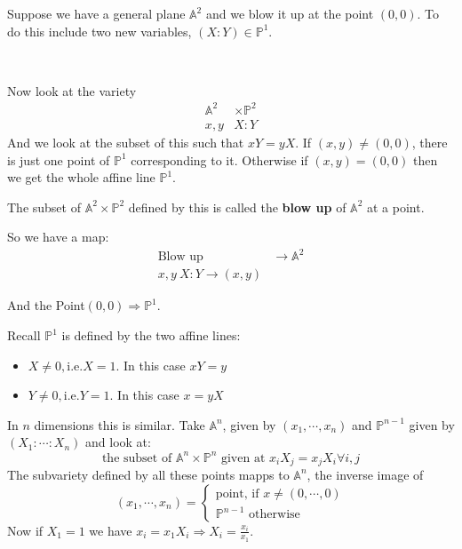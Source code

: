 Suppose we have a general plane $\mathbb{A}^2$ and we blow it up at the point $(0,0)$. To do this include two new variables, $(X\colon Y)\in \mathbb{P}^1$.

\

Now look at the variety \begin{align*}
    \mathbb{A}^2&\times \mathbb{P}^2\\
    x,y&X\colon Y
\end{align*}
And we look at the subset of this such that $xY = yX$. If $(x,y)\neq (0,0)$, there is just one point of $\mathbb{P}^1$ corresponding to it. Otherwise if $(x,y) = (0,0)$ then we get the whole affine line $\mathbb{P}^1$.
\begin{definition}
    The subset of $\mathbb{A}^2\times \mathbb{P}^2$ defined by this is called the \textbf{blow up} of $\mathbb{A}^2$ at a point.
    
    So we have a map:\begin{align*}
        \text{Blow up} &\rightarrow \mathbb{A}^2\\
        x,y \ X\colon Y\rightarrow (x,y)
    \end{align*}

    And the Point$(0,0)\Rightarrow \mathbb{P}^1$.
\end{definition}
Recall $\mathbb{P}^1$ is defined by the two affine lines:\begin{itemize}
    \item $X\neq 0, \text{i.e.} X=1$. In this case $xY=y$
    \item $Y\neq 0, \text{i.e.} Y=1$. In this case $x=yX$ 
\end{itemize}

\begin{definition}
    In $n$ dimensions this is similar. Take $\mathbb{A}^n$, given by $(x_1,\cdots,x_n)$ and $\mathbb{P}^{n-1}$ given by $(X_1\colon\cdots\colon X_n)$ and look at:\begin{equation*}
        \text{the subset of }\mathbb{A}^n\times \mathbb{P}^n\text{ given at }x_iX_j = x_jX_i \forall i,j
    \end{equation*}
    The subvariety defined by all these points mapps to $\mathbb{A}^n$, the inverse image of \[(x_1,\cdots,x_n) = \begin{cases}
        \text{point, if }x\neq (0,\cdots,0)\\
        \mathbb{P}^{n-1} \text{ otherwise}
    \end{cases}\]
Now if $X_1 = 1$ we have $x_i  = x_1X_i \Rightarrow X_i = \frac{x_i}{x_1}$.
\end{definition}

